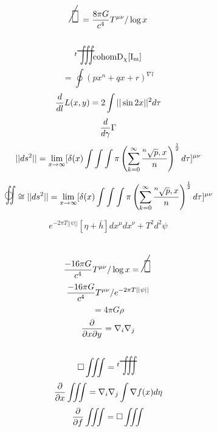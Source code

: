 \documentclass{jsarticle}
\begin{document}
\title{}
\author{}
\date{}
\maketitle

   \newcommand{\oiint}{%
	   \begin{picture}(15,15)
		   \put(0,0){
			   $ \scalebox{1}[2]{$\iint$} $}
		   \put(2,2){$\bigcirc$}
	   \end{picture} %
	   }
   \newcommand{\variint}{%
	\begin{picture}(15,30)
		\put(0,0){
			$ \iint $}
		\put(0,5){\line(15,0){15}}
	\end{picture} %
}

\newcommand{\variiint}{%
	\begin{picture}(15,15)
		\put(0,0){
			$ \iiint $}
		\put(0,5){\line(15,0){20}}
	\end{picture} %
}



 \newcommand{\alearletter}{%
	 \begin{picture}(10,20)
		 \put(0,0){
			 $ \square $}
		 \put(0,0){\line(1,1){10}}
	 \end{picture} %
	 }


  $$ \scalebox{1}[2]{\alearletter} = 
  {{{{8 \pi G} \over {c^4}}T^{\mu\nu}}/ \log x} $$
  $$ {}^{t}\scalebox{1}[2]{\variiint}\mathrm{cohom D_{\chi}[I_m]}$$
  $$ = \oint {(px^n + qx + r)^{\nabla l}} $$
  $$ {d \over d l}L(x,y) = 2 \int ||\sin 2x||^{2}d \tau $$
  $$ {d \over d \gamma}\Gamma $$
 $$ ||ds^2|| = \lim_{x \to \infty} [\delta(x) \int \int \int \pi \left( \sum_{k=0}^{\infty}
		{{}^n\sqrt{p},x \over n} \right)
^{1 \over 2}d \tau]^{\mu\nu} $$

 $$\oiint  \cong  ||ds^2|| = \lim_{x \to \infty} 
 [\delta(x) \int \int \int \pi \left( \sum_{k=0}^{\infty}
		{{}^n\sqrt{p},x \over n} 
		\right)^{1 \over 2}d \tau]^{\mu\nu} $$
 
 $$ e^{-2\pi T||\psi||}[\eta + \bar{h}]dx^{\mu}dx^{\nu} + T^2 d^2 \psi $$
 $$ {{-16 \pi G} \over c^4}T^{\mu\nu}/ \log x =  
 \scalebox{1}[2]{\alearletter} $$
 $${{-16 \pi G} \over c^4}T^{\mu\nu}/ e^{-2\pi T||\psi||} $$
 $$ = 4 \pi G \rho $$
 $$ {\partial \over {\partial x \partial y}} = \nabla_{i} \nabla_{j} $$ 
 $$ \square \iiint  = {}^{t}\scalebox{1}[2]{\variiint}\ $$
 $$ {\partial \over {\partial x}} \iiint = \nabla_{i}\nabla_{j} \int
 \nabla f(x) d \eta $$
 $$ {\partial \over {\partial f}}\iiint = \square \iiint $$
\end{document}
